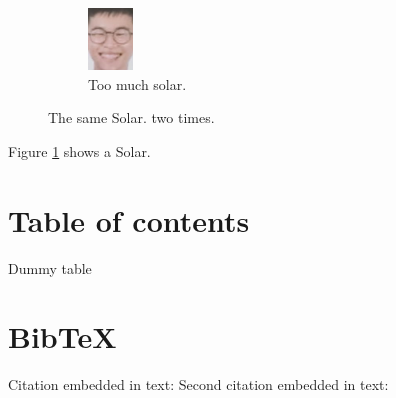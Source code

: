 \documentclass{article}
\begin{document}
\begin{figure}[ht!]
\begin{subfigure}[b]{0.5\linewidth}
\includegraphics[width=\linewidth]{images/solar.png}
\caption{Too much solar.}
\end{subfigure}

\caption{The same Solar. two times.}
\label{fig:solar1}
\end{figure}

Figure \ref{fig:solar1} shows a Solar.

\section{Table of contents}
\begin{table}
\caption{Dummy table}
\end{table}


\section{BibTeX}
Citation embedded in text: \autocite[1]{DUMMY:1}
Second citation embedded in text: \autocite[1]{WEBSITE:1}
\printbibliography
\end{document}
